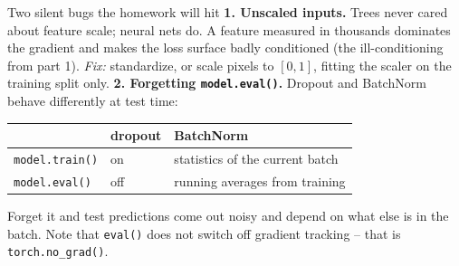 \documentclass[aspectratio=43]{beamer}
\begin{document}
\begin{frame}{Two silent bugs the homework will hit}
  \small
  \textbf{1. Unscaled inputs.} Trees never cared about feature scale; neural nets do. A
  feature measured in thousands dominates the gradient and makes the loss surface badly
  conditioned (the ill-conditioning from part 1). \emph{Fix:} standardize, or scale pixels to
  $[0,1]$, fitting the scaler on the training split only.
  \vskip 6pt
  {\small \textbf{2. Forgetting \texttt{model.eval()}.} Dropout and BatchNorm behave differently at
  test time:}
  \vskip 2pt
  \begin{center}\footnotesize
  \begin{tabular}{@{}l l l@{}}
    & \textbf{dropout} & \textbf{BatchNorm} \\ \hline
    \texttt{model.train()} & on & statistics of the current batch \\
    \texttt{model.eval()} & off & running averages from training \\
  \end{tabular}
  \end{center}
  \vskip 2pt
  {\footnotesize Forget it and test predictions come out noisy and depend on what else is in the
  batch. Note that \texttt{eval()} does not switch off gradient tracking -- that is
  \texttt{torch.no\_grad()}.}
  \vfill
\end{frame}
\end{document}
